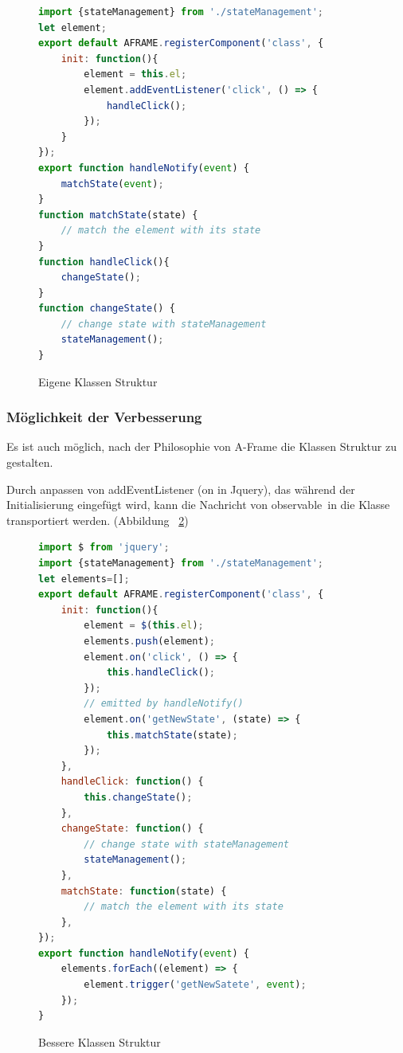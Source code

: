 \begin{figure}[ht]
\vspace*{1em}
\centering
\caption[Eigene Klassen Struktur]{Eigene Klassen Struktur}
\begin{lstlisting}[language=JavaScript, style=htmlcssjs]
import {stateManagement} from './stateManagement';
let element;
export default AFRAME.registerComponent('class', {
    init: function(){
        element = this.el;
        element.addEventListener('click', () => {
            handleClick();
        });
    }
});
export function handleNotify(event) {
    matchState(event);
}
function matchState(state) {
    // match the element with its state
}
function handleClick(){
    changeState();
}
function changeState() {
    // change state with stateManagement
    stateManagement();
}
\end{lstlisting}
\label{fig:eigenesClass} 
\end{figure}
 
 \subsubsection{Möglichkeit der Verbesserung}
 Es ist auch möglich, nach der Philosophie von A-Frame die Klassen Struktur zu gestalten.
 
 Durch anpassen von {\selectfont addEventListener} ({\selectfont on} in Jquery), das während der Initialisierung eingefügt wird, kann die Nachricht von \glqq observable\grqq\ in die Klasse transportiert werden. (Abbildung ~\ref{fig:bestesClass})
 
\begin{figure}[ht]
\vspace*{1em}
\centering
\caption[Bessere Klassen Struktur]{Bessere Klassen Struktur}
\begin{lstlisting}[language=JavaScript, style=htmlcssjs]
import $ from 'jquery';
import {stateManagement} from './stateManagement';
let elements=[];
export default AFRAME.registerComponent('class', {
    init: function(){
        element = $(this.el);
        elements.push(element);
        element.on('click', () => {
            this.handleClick();
        });
        // emitted by handleNotify()
        element.on('getNewState', (state) => {
            this.matchState(state);
        });
    },
    handleClick: function() {
        this.changeState();
    },
    changeState: function() {
        // change state with stateManagement
        stateManagement();
    },
    matchState: function(state) {
        // match the element with its state
    },
});
export function handleNotify(event) {
    elements.forEach((element) => {
        element.trigger('getNewSatete', event);
    });
}
\end{lstlisting}
\label{fig:bestesClass} 
\end{figure}
 
